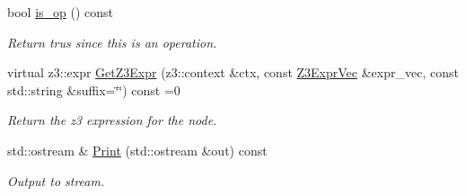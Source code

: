 \begin{DoxyCompactItemize}
bool \mbox{\hyperlink{classilang_1_1_expr_op_aed280897e924cf962212e1d97866c953}{is\+\_\+op}} () const
\begin{DoxyCompactList}\small\item\em Return trus since this is an operation. \end{DoxyCompactList}\item 
\mbox{\label{classilang_1_1_expr_op_a32cfcfef49677d6008f91c64dd74c56a}} 
virtual z3\+::expr \mbox{\hyperlink{classilang_1_1_expr_op_a32cfcfef49677d6008f91c64dd74c56a}{Get\+Z3\+Expr}} (z3\+::context \&ctx, const \mbox{\hyperlink{namespaceilang_adc4eee919aa24fff882d03a48d733c19}{Z3\+Expr\+Vec}} \&expr\+\_\+vec, const std\+::string \&suffix=\char`\"{}\char`\"{}) const =0
\begin{DoxyCompactList}\small\item\em Return the z3 expression for the node. \end{DoxyCompactList}\item 
\mbox{\label{classilang_1_1_expr_op_ac1da0186170a278453d4dfc6344f1d80}} 
std\+::ostream \& \mbox{\hyperlink{classilang_1_1_expr_op_ac1da0186170a278453d4dfc6344f1d80}{Print}} (std\+::ostream \&out) const
\begin{DoxyCompactList}\small\item\em Output to stream. \end{DoxyCompactList}\end{DoxyCompactItemize}
